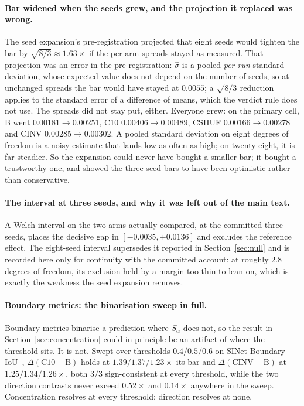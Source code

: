 \documentclass{article}
\begin{document}
\paragraph{Bar widened when the seeds grew, and the projection it replaced was wrong.} The seed
expansion's pre-registration projected that eight seeds would tighten the bar by
$\sqrt{8/3} \approx 1.63\times$ if the per-arm spreads stayed as measured. That projection was an
error in the pre-registration: $\hat{\sigma}$ is a pooled \emph{per-run} standard deviation, whose
expected value does not depend on the number of seeds, so at unchanged spreads the bar would have
stayed at $0.0055$; a $\sqrt{8/3}$ reduction applies to the standard error of a difference of means,
which the verdict rule does not use. The spreads did not stay put, either. Everyone grew: on the primary cell, B went $0.00181 \rightarrow 0.00251$, C10 $0.00406 \rightarrow 0.00489$, CSHUF
$0.00166 \rightarrow 0.00278$ and CINV $0.00285 \rightarrow 0.00302$. A pooled standard deviation
on eight degrees of freedom is a noisy estimate that lands low as often as high; on twenty-eight, it
is far steadier. So the expansion could never have bought a smaller bar; it bought a trustworthy
one, and showed the three-seed bars to have been optimistic rather than conservative.



\paragraph{The interval at three seeds, and why it was left out of the main text.} A Welch interval on the two
arms actually compared, at the committed three seeds, places the decisive gap in
$[-0.0035, +0.0136]$ and excludes the reference effect. The eight-seed interval supersedes it
reported in Section~\ref{sec:null} and is recorded here only for continuity with the committed
account: at roughly $2.8$ degrees of freedom, its exclusion held by a margin too thin to lean on,
which is exactly the weakness the seed expansion removes.

\paragraph{Boundary metrics: the binarisation sweep in full.} Boundary metrics binarise a
prediction where $S_\alpha$ does not, so the result in Section~\ref{sec:concentration} could in principle be an artifact of where the threshold sits. It is not. Swept over thresholds
$0.4 / 0.5 / 0.6$ on SINet Boundary-IoU~\citep{cheng2021boundary}, $\Delta(\mathrm{C10}-\mathrm{B})$ holds at
$1.39 / 1.37 / 1.23 \times$ its bar and $\Delta(\mathrm{CINV}-\mathrm{B})$ at
$1.25 / 1.34 / 1.26 \times$, both $3/3$ sign-consistent at every threshold, while the two direction
contrasts never exceed $0.52\times$ and $0.14\times$ anywhere in the sweep. Concentration resolves
at every threshold; direction resolves at none.
\end{document}
